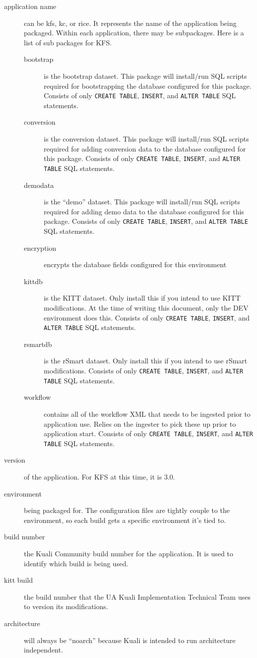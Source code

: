 \documentclass[12pt,notitlepage]{article}
\begin{document}
\begin{description}
  \item[application name] can be kfs, kc, or rice. It represents the name of the application 
    being packaged. Within each application, there may be subpackages. Here is a list of sub
    packages for KFS.
    \begin{description}
      \item[bootstrap] is the bootstrap dataset. This package will install/run SQL scripts required
        for bootstrapping the database configured for this package. Consists of only
        \verb|CREATE TABLE|, \verb|INSERT|, and \verb|ALTER TABLE| SQL statements.
      \item[conversion] is the conversion dataset. This package will install/run SQL scripts required
        for adding conversion data to the database configured for this package. Consists of only
        \verb|CREATE TABLE|, \verb|INSERT|, and \verb|ALTER TABLE| SQL statements.
      \item[demodata] is the ``demo'' dataset. This package will install/run SQL scripts required for
        adding demo data to the database configured for this package. Consists of only
        \verb|CREATE TABLE|, \verb|INSERT|, and \verb|ALTER TABLE| SQL statements.
      \item[encryption] encrypts the database fields configured for this environment
      \item[kittdb] is the KITT dataset. Only install this if you intend to use KITT modifications. At
        the time of writing this document, only the DEV environment does this. Consists of only
        \verb|CREATE TABLE|, \verb|INSERT|, and \verb|ALTER TABLE| SQL statements.
      \item[rsmartdb] is the rSmart dataset. Only install this if you intend to use rSmart modifications.
        Consists of only \verb|CREATE TABLE|, \verb|INSERT|, and \verb|ALTER TABLE| SQL statements.
      \item[workflow] contains all of the workflow XML that needs to be ingested prior to application use.
        Relies on the ingester to pick these up prior to application start. Consists of only
        \verb|CREATE TABLE|, \verb|INSERT|, and \verb|ALTER TABLE| SQL statements.
    \end{description}
  \item[version] of the application. For KFS at this time, it is 3.0.
  \item[environment] being packaged for. The configuration files are tightly couple to the
    environment, so each build gets a specific environment it's tied to.
  \item[build number] the Kuali Community build number for the application. It is used to identify
    which build is being used.
  \item[kitt build] the build number that the UA Kuali Implementation Technical Team uses to version 
    its modifications.
  \item[architecture] will always be ``noarch'' because Kuali is intended to run architecture independent.
\end{description}
\end{document}
